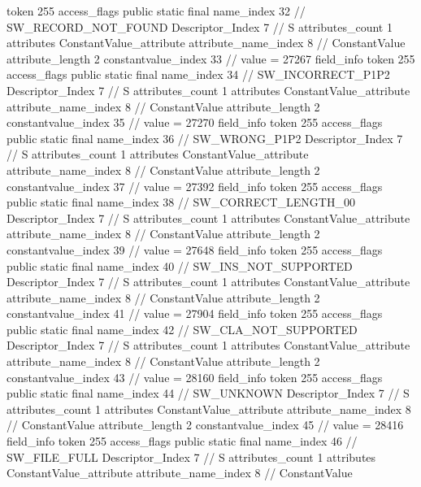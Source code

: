 {{{{{				token	255
				access_flags	public static final
				name_index	32		// SW_RECORD_NOT_FOUND
				Descriptor_Index	7		// S
				attributes_count	1
				attributes {
				ConstantValue_attribute {
					attribute_name_index	8		// ConstantValue
					attribute_length	2
					constantvalue_index	33		// value = 27267
				}
				}
			}
			field_info {
				token	255
				access_flags	public static final
				name_index	34		// SW_INCORRECT_P1P2
				Descriptor_Index	7		// S
				attributes_count	1
				attributes {
				ConstantValue_attribute {
					attribute_name_index	8		// ConstantValue
					attribute_length	2
					constantvalue_index	35		// value = 27270
				}
				}
			}
			field_info {
				token	255
				access_flags	public static final
				name_index	36		// SW_WRONG_P1P2
				Descriptor_Index	7		// S
				attributes_count	1
				attributes {
				ConstantValue_attribute {
					attribute_name_index	8		// ConstantValue
					attribute_length	2
					constantvalue_index	37		// value = 27392
				}
				}
			}
			field_info {
				token	255
				access_flags	public static final
				name_index	38		// SW_CORRECT_LENGTH_00
				Descriptor_Index	7		// S
				attributes_count	1
				attributes {
				ConstantValue_attribute {
					attribute_name_index	8		// ConstantValue
					attribute_length	2
					constantvalue_index	39		// value = 27648
				}
				}
			}
			field_info {
				token	255
				access_flags	public static final
				name_index	40		// SW_INS_NOT_SUPPORTED
				Descriptor_Index	7		// S
				attributes_count	1
				attributes {
				ConstantValue_attribute {
					attribute_name_index	8		// ConstantValue
					attribute_length	2
					constantvalue_index	41		// value = 27904
				}
				}
			}
			field_info {
				token	255
				access_flags	public static final
				name_index	42		// SW_CLA_NOT_SUPPORTED
				Descriptor_Index	7		// S
				attributes_count	1
				attributes {
				ConstantValue_attribute {
					attribute_name_index	8		// ConstantValue
					attribute_length	2
					constantvalue_index	43		// value = 28160
				}
				}
			}
			field_info {
				token	255
				access_flags	public static final
				name_index	44		// SW_UNKNOWN
				Descriptor_Index	7		// S
				attributes_count	1
				attributes {
				ConstantValue_attribute {
					attribute_name_index	8		// ConstantValue
					attribute_length	2
					constantvalue_index	45		// value = 28416
				}
				}
			}
			field_info {
				token	255
				access_flags	public static final
				name_index	46		// SW_FILE_FULL
				Descriptor_Index	7		// S
				attributes_count	1
				attributes {
				ConstantValue_attribute {
					attribute_name_index	8		// ConstantValue
}}}}}}}
